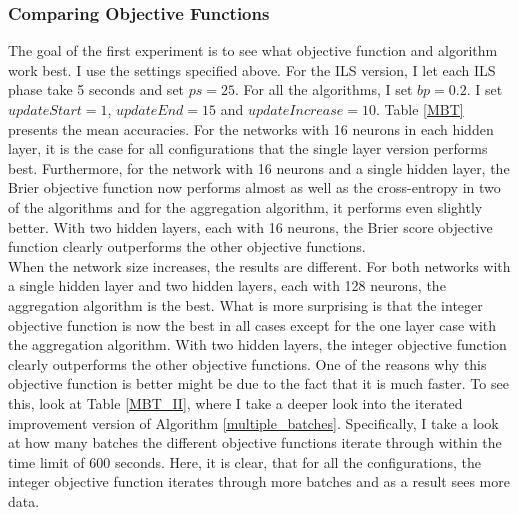 \subsubsection{Comparing Objective Functions}
The goal of the first experiment is to see what objective function and algorithm work best. I use the settings specified above. For the ILS version, I let each ILS phase take 5 seconds and set $ps=25$. For all the algorithms, I set $bp=0.2$. I set $updateStart=1$, $updateEnd=15$ and $updateIncrease=10$. Table \ref{MBT} presents the mean accuracies. For the networks with 16 neurons in each hidden layer, it is the case for all configurations that the single layer version performs best. Furthermore, for the network with 16 neurons and a single hidden layer, the Brier objective function now performs almost as well as the cross-entropy in two of the algorithms and for the aggregation algorithm, it performs even slightly better. With two hidden layers, each with 16 neurons, the Brier score objective function clearly outperforms the other objective functions. \\



\noindent When the network size increases, the results are different. For both networks with a single hidden layer and two hidden layers, each with 128 neurons, the aggregation algorithm is the best. What is more surprising is that the integer objective function is now the best in all cases except for the one layer case with the aggregation algorithm. With two hidden layers, the integer objective function clearly outperforms the other objective functions. One of the reasons why this objective function is better might be due to the fact that it is much faster. To see this, look at Table \ref{MBT_II}, where I take a deeper look into the iterated improvement version of Algorithm \ref{multiple_batches}. Specifically, I take a look at how many batches the different objective functions iterate through within the time limit of 600 seconds. Here, it is clear, that for all the configurations, the integer objective function iterates through more batches and as a result sees more data. \\



